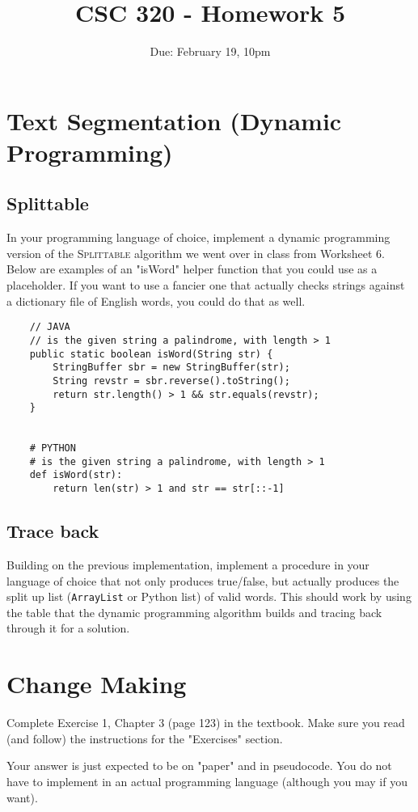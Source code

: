 \documentclass[12pt]{article}
\title{CSC 320 - Homework 5}
\author{}
\date{Due: February 19, 10pm}
\begin{document}

\section{Text Segmentation (Dynamic Programming)}

\subsection{\sc Splittable}
In your programming language of choice, implement a dynamic programming version of the \textsc{Splittable} algorithm we went over in class from Worksheet 6. Below are examples of an "isWord" helper function that you could use as a placeholder. If you want to use a fancier one that actually checks strings against a dictionary file of English words, you could do that as well.

\begin{verbatim}
    // JAVA
    // is the given string a palindrome, with length > 1
    public static boolean isWord(String str) {
        StringBuffer sbr = new StringBuffer(str);
        String revstr = sbr.reverse().toString();
        return str.length() > 1 && str.equals(revstr);
    }


    # PYTHON
    # is the given string a palindrome, with length > 1
    def isWord(str):
        return len(str) > 1 and str == str[::-1]
\end{verbatim}

\subsection{Trace back}

Building on the previous implementation, implement a procedure in your language of choice that not only produces true/false, but actually produces the split up list (\verb+ArrayList+ or Python list) of valid words. This should work by using the table that the dynamic programming algorithm builds and tracing back through it for a solution.


\section{Change Making}

Complete Exercise 1, Chapter 3 (page 123) in the textbook. Make sure you read (and follow) the instructions for the "Exercises" section.

Your answer is just expected to be on "paper" and in pseudocode. You do not have to implement in an actual programming language (although you may if you want).
\end{document}
